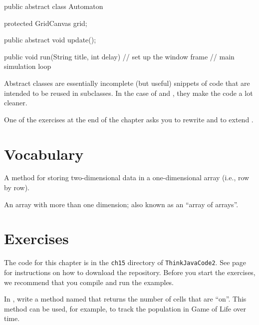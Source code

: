 \begin{code}
public abstract class Automaton {
    protected GridCanvas grid;

    public abstract void update();

    public void run(String title, int delay) {
        // set up the window frame
        // main simulation loop
    }
}
\end{code}

Abstract classes are essentially incomplete (but useful) snippets of code that are intended to be reused in subclasses.
In the case of  and , they make the code a lot cleaner.

One of the exercises at the end of the chapter asks you to rewrite  and  to extend .


\section{Vocabulary}

\begin{description}

A method for storing two-dimensional data in a one-dimensional array (i.e., row by row).

An array with more than one dimension; also known as an ``array of arrays''.


\end{description}


\section{Exercises}

The code for this chapter is in the {\tt ch15} directory of {\tt ThinkJavaCode2}.
See page~\pageref{code} for instructions on how to download the repository.
Before you start the exercises, we recommend that you compile and run the examples.


\begin{exercise}
In , write a method named  that returns the number of cells that are ``on''.
This method can be used, for example, to track the population in Game of Life over time.
\end{exercise}


